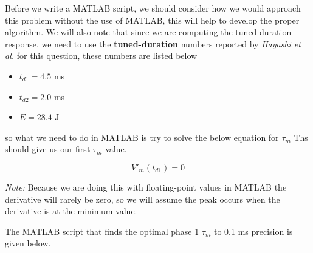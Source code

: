 \documentclass[]{report}
\begin{document}
Before we write a MATLAB script, we should consider how we would approach this problem without the use of MATLAB, this will help to develop the proper algorithm. We will also note that since we are computing the tuned duration response, we need to use the \textbf{tuned-duration} numbers reported by \textit{Hayashi et al.} for this question, these numbers are listed below

\begin{itemize}
	\item $t_{d1} = 4.5$ ms
	\item $t_{d2} = 2.0$ ms
	\item $E = 28.4$ J
\end{itemize}

so what we need to do in MATLAB is try to solve the below equation for $\tau_m$ Ths should give us our first $\tau_m$ value.

\[
V'_m(t_{d1}) = 0
\]


\textit{Note:} Because we are doing this with floating-point values in MATLAB the derivative will rarely be zero, so we will assume the peak occurs when the derivative is at the minimum value.

The MATLAB script that finds the optimal phase 1 $\tau_m$ to 0.1 ms precision is given below. \newpage
\end{document}
